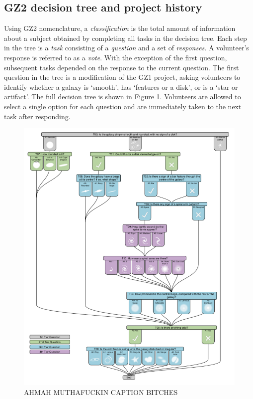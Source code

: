 \subsection{GZ2 decision tree and project history}
Using GZ2 nomenclature, a \textit{classification} is the total amount of information about a subject obtained by completing all tasks in the decision tree. Each step in the tree is a \textit{task} consisting of a \textit{question} and a set of \textit{responses}. A volunteer's response is referred to as a \textit{vote}. With the exception of the first question, subsequent tasks depended on the response to the current question. The first question in the tree is a modification of the GZ1 project, asking volunteers to identify whether a galaxy is `smooth', has `features or a disk', or is a `star or artifact'. The full decision tree is shown in Figure \ref{fig: gz2 decision tree}. Volunteers are allowed to select a single option for each question and are immediately taken to the next task after responding. 

\begin{figure}[h!]
\includegraphics[width=\textwidth]{Figures/gz2_tree.pdf}
\caption{AHMAH MUTHAFUCKIN CAPTION BITCHES}
\label{fig: gz2 decision tree}
\end{figure}

